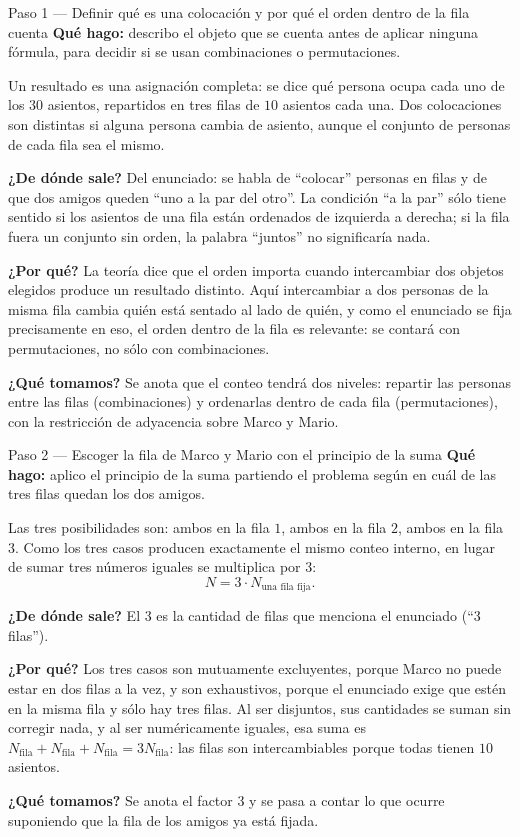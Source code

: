 \documentclass[11pt]{article}
\begin{document}
\begin{paso}{Paso 1 --- Definir qué es una colocación y por qué el orden dentro de la fila cuenta}
\textbf{Qué hago:} describo el objeto que se cuenta antes de aplicar ninguna fórmula, para decidir si se usan combinaciones o permutaciones.

Un resultado es una asignación completa: se dice qué persona ocupa cada uno de los $30$ asientos, repartidos en tres filas de $10$ asientos cada una. Dos colocaciones son distintas si alguna persona cambia de asiento, aunque el conjunto de personas de cada fila sea el mismo.

\textbf{¿De dónde sale?} Del enunciado: se habla de ``colocar'' personas en filas y de que dos amigos queden ``uno a la par del otro''. La condición ``a la par'' sólo tiene sentido si los asientos de una fila están ordenados de izquierda a derecha; si la fila fuera un conjunto sin orden, la palabra ``juntos'' no significaría nada.

\textbf{¿Por qué?} La teoría dice que el orden importa cuando intercambiar dos objetos elegidos produce un resultado distinto. Aquí intercambiar a dos personas de la misma fila cambia quién está sentado al lado de quién, y como el enunciado se fija precisamente en eso, el orden dentro de la fila es relevante: se contará con permutaciones, no sólo con combinaciones.

\textbf{¿Qué tomamos?} Se anota que el conteo tendrá dos niveles: repartir las personas entre las filas (combinaciones) y ordenarlas dentro de cada fila (permutaciones), con la restricción de adyacencia sobre Marco y Mario.
\end{paso}

\begin{paso}{Paso 2 --- Escoger la fila de Marco y Mario con el principio de la suma}
\textbf{Qué hago:} aplico el principio de la suma partiendo el problema según en cuál de las tres filas quedan los dos amigos.

Las tres posibilidades son: ambos en la fila $1$, ambos en la fila $2$, ambos en la fila $3$. Como los tres casos producen exactamente el mismo conteo interno, en lugar de sumar tres números iguales se multiplica por $3$:
\[
  N = 3\cdot N_{\text{una fila fija}} .
\]

\textbf{¿De dónde sale?} El $3$ es la cantidad de filas que menciona el enunciado (``3 filas'').

\textbf{¿Por qué?} Los tres casos son mutuamente excluyentes, porque Marco no puede estar en dos filas a la vez, y son exhaustivos, porque el enunciado exige que estén en la misma fila y sólo hay tres filas. Al ser disjuntos, sus cantidades se suman sin corregir nada, y al ser numéricamente iguales, esa suma es $N_{\text{fila}}+N_{\text{fila}}+N_{\text{fila}}=3N_{\text{fila}}$: las filas son intercambiables porque todas tienen $10$ asientos.

\textbf{¿Qué tomamos?} Se anota el factor $3$ y se pasa a contar lo que ocurre suponiendo que la fila de los amigos ya está fijada.
\end{paso}
\end{document}
